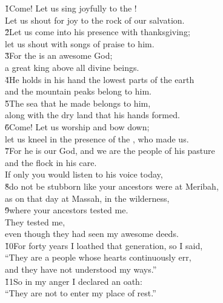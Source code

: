 \begin{poetry}
\poeml \v{1}Come! Let us sing joyfully to the ! \\
\poemll    Let us shout for joy to the rock of our salvation. \\
\poeml \v{2}Let us come into his presence with thanksgiving; \\
\poemll    let us shout with songs of praise to him. \\
\poeml \v{3}For the  is an awesome God; \\
\poemll    a great king above all divine beings. \\
\poeml \v{4}He holds in his hand the lowest parts of the earth \\
\poemll    and the mountain peaks belong to him. \\
\poeml \v{5}The sea that he made belongs to him, \\
\poemll    along with the dry land that his hands formed. \\
\poeml \v{6}Come! Let us worship and bow down; \\
\poemll    let us kneel in the presence of the , who made us. \\
\poeml \v{7}For he is our God, and we are the people of his pasture \\
\poemll    and the flock in his care. \\
\poeml If only you would listen to his voice today, \\
\poeml \v{8}do not be stubborn like your ancestors were at Meribah, \\
\poeml as on that day at Massah, in the wilderness, \\
\poeml \v{9}where your ancestors tested me. \\
\poeml They tested me, \\
\poemll    even though they had seen my awesome deeds. \\
\poeml \v{10}For forty years I loathed that generation, so I said, \\
\poemll    ``They are a people whose hearts continuously err, \\
\poemlll       and they have not understood my ways.'' \\
\poeml \v{11}So in my anger I declared an oath: \\
\poemll    ``They are not to enter my place of rest.''
\end{poetry}

